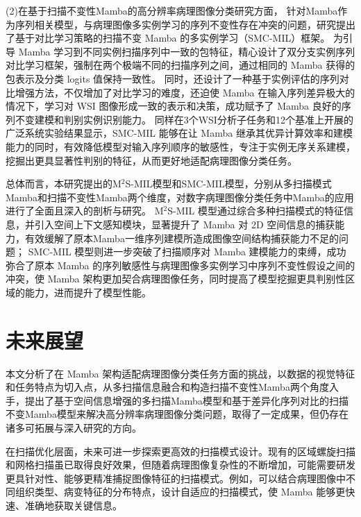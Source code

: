 (2)在基于扫描不变性Mamba的高分辨率病理图像分类研究方面，
针对Mamba作为序列相关模型，与病理图像多实例学习的序列不变性存在冲突的问题，研究提出了基于对比学习策略的扫描不变 Mamba 的多实例学习（SMC-MIL）框架。
为引导 Mamba 学习到不同实例扫描序列中一致的包特征，精心设计了双分支实例序列对比学习框架，强制在两个极端不同的扫描序列之间，通过相同的 Mamba 获得的包表示及分类 logits 值保持一致性。
同时，还设计了一种基于实例评估的序列对比增强方法，不仅增加了对比学习的难度，还迫使 Mamba 在输入序列差异极大的情况下，学习对 WSI 图像形成一致的表示和决策，成功赋予了 Mamba 良好的序列不变建模和判别实例识别能力。
同样在3个WSI分析子任务和12个基准上开展的广泛系统实验结果显示，SMC-MIL 能够在让 Mamba 继承其优异计算效率和建模能力的同时，有效降低模型对输入序列顺序的敏感性，专注于实例无序关系建模，挖掘出更具显著性判别的特征，从而更好地适配病理图像分类任务。​

总体而言，本研究提出的M$^2$S-MIL模型和SMC-MIL模型，分别从多扫描模式Mamba和扫描不变性Mamba两个维度，对数字病理图像分类任务中Mamba的应用进行了全面且深入的剖析与研究。
M$^2$S-MIL 模型通过综合多种扫描模式的特征信息，并引入空间上下文感知模块，显著提升了 Mamba 对 2D 空间信息的捕获能力，有效缓解了原本Mamba一维序列建模所造成图像空间结构捕获能力不足的问题；
SMC-MIL 模型则进一步突破了扫描顺序对 Mamba 建模能力的束缚，成功弥合了原本 Mamba 的序列敏感性与病理图像多实例学习中序列不变性假设之间的冲突，使 Mamba 架构更加契合病理图像任务，同时提高了模型挖掘更具判别性区域的能力，进而提升了模型性能。​


\section[\hspace{-2pt}未来展望]{{\heiti{} \hspace{-8pt}未来展望}}\label{section5: 未来展望}

本文分析了在 Mamba 架构适配病理图像分类任务方面的挑战，以数据的视觉特征和任务特点为切入点，从多扫描信息融合和构造扫描不变性Mamba两个角度入手，提出了基于空间信息增强的多扫描Mamba模型和基于差异化序列对比的扫描不变Mamba模型来解决高分辨率病理图像分类问题，取得了一定成果，但仍存在诸多可拓展与深入研究的方向。​

在扫描优化层面，未来可进一步探索更高效的扫描模式设计。现有的区域螺旋扫描和网格扫描虽已取得良好效果，但随着病理图像复杂性的不断增加，可能需要研发更具针对性、能够更精准捕捉图像特征的扫描模式。例如，可以结合病理图像中不同组织类型、病变特征的分布特点，设计自适应的扫描模式，使 Mamba 能够更快速、准确地获取关键信息。​

